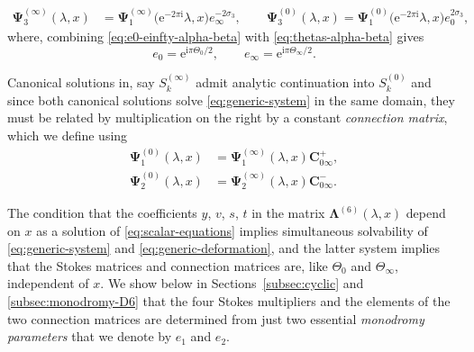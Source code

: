 \documentclass[11pt]{article}
\numberwithin{equation}{section}
\numberwithin{equation}{section}
\newcommand{\ee}{\mathrm{e}}
\newcommand{\ii}{\mathrm{i}}
\begin{document}
\begin{align}%
\mathbf{\Psi}_3^{(\infty)}(\lambda, x) &= \mathbf{\Psi}_1^{(\infty)}\big(\ee^{-2\pi \ii} \lambda, x\big) e_\infty^{-2\sigma_3},
\qquad
\mathbf{\Psi}_3^{(0)}(\lambda, x) = \mathbf{\Psi}_1^{(0)}\big(\ee^{-2\pi \ii} \lambda, x\big) e_0^{2\sigma_3},\label{eq:stokes-condition-4}
\end{align}
where, combining \eqref{eq:e0-einfty-alpha-beta} with \eqref{eq:thetas-alpha-beta} gives
\begin{equation}
 e_0 = \ee^{\ii \pi \Theta_0/2},\qquad e_\infty = \ee^{\ii \pi \Theta_\infty/2}.
 \label{eq:e0-einfty}
\end{equation}

Canonical solutions in, say $S_k^{(\infty)}$ admit analytic continuation into $S_k^{(0)}$ and since both canonical solutions solve \eqref{eq:generic-system} in the same domain, they must be related by multiplication on the right by a constant \emph{connection matrix}, which we define using
\begin{align}
\label{eq:connection-matrix-1}\mathbf{\Psi}_1^{(0)}(\lambda, x) &= \mathbf{\Psi}_1^{(\infty)}(\lambda, x) \mathbf{C}_{0\infty}^+, \\
\label{eq:connection-matrix-2}\mathbf{\Psi}_2^{(0)}(\lambda, x) &= \mathbf{\Psi}_2^{(\infty)}(\lambda, x) \mathbf{C}_{0\infty}^-.
\end{align}

The condition that the coefficients $y$, $v$, $s$, $t$ in the matrix $\mathbf{\Lambda}^{(6)}(\lambda,x)$ depend on $x$ as a solution of \eqref{eq:scalar-equations} implies simultaneous solvability of \eqref{eq:generic-system} and \eqref{eq:generic-deformation}, and the latter system implies that the Stokes matrices and connection matrices are, like $\Theta_0$ and $\Theta_\infty$, independent of $x$. We show below in Sections~\ref{subsec:cyclic} and \ref{subsec:monodromy-D6} that the four Stokes multipliers and the elements of the two connection matrices are determined from just two essential \emph{monodromy parameters} that we denote by $e_1$ and $e_2$.
\end{document}
